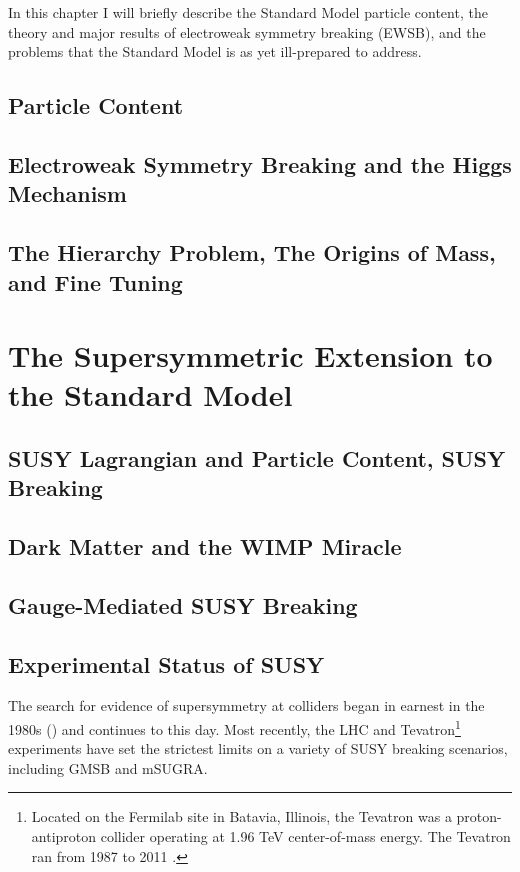 \documentclass[12pt, letterpaper]{report}
\begin{document}
In this chapter I will briefly describe the Standard Model particle content, the theory and major results of electroweak symmetry breaking (EWSB), and the problems that the Standard Model is as yet ill-prepared to address.

\section{Particle Content}
\section{Electroweak Symmetry Breaking and the Higgs Mechanism}
\section{The Hierarchy Problem, The Origins of Mass, and Fine Tuning}

\chapter{The Supersymmetric Extension to the Standard Model}
\section{SUSY Lagrangian and Particle Content, SUSY Breaking}
\section{Dark Matter and the WIMP Miracle}
\section{Gauge-Mediated SUSY Breaking}
\section{Experimental Status of SUSY}

The search for evidence of supersymmetry at colliders began in earnest in the 1980s (\cite{SUSY_history}) and continues to this day.  Most recently, the LHC and Tevatron\footnote{Located on the Fermilab site in Batavia, Illinois, the Tevatron was a proton-antiproton collider operating at 1.96 TeV center-of-mass energy.  The Tevatron ran from 1987 to 2011 \cite{Tevatron_lifetime}.} experiments have set the strictest limits on a variety of SUSY breaking scenarios, including GMSB and mSUGRA.
\end{document}
